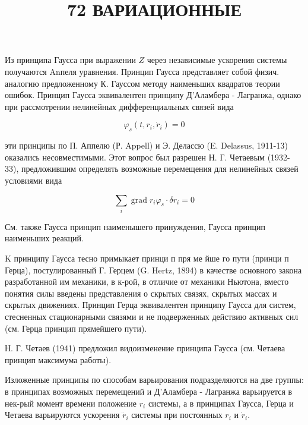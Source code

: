 \documentclass[10pt]{article}
\title{72 ВАРИАЦИОННЫЕ }
\author{}
\date{}
\begin{document}
\maketitle

Из принципа Гаусса при выражении $Z$ через независимые ускорения системы получаются Anпеля уравнения. Принцип Гаусса представляет собой физич. аналогию предложенному К. Гауссом методу наименьших квадратов теории ошибок. Принцип Гаусса эквивалентен принципу Д'Аламбера - Лагранжа, однако при рассмотрении нелинейных дифференциальных связей вида



\[

\varphi_{s}\left(t, r_{i}, \dot{r}_{i}\right)=0

\]



эти принципы по П. Аппелю (Р. Appell) и Э. Делассю (E. Delassus, 1911-13) оказались несовместимыми. Этот вопрос был разрешен Н. Г. Четаевым (1932-33), предложившим определять возможные перемещения для нелинейных связей условиями вида



\[

\sum_{i} \operatorname{grad} r_{i} \varphi_{s} \cdot \delta r_{i}=0

\]



См. также Гаусса принцип наименышего принуждения, Гаусса принцип наименьших реакций.



K принципу Гаусса тесно примыкает принци п пря ме йше го пути (принци п Герца), постулированный Г. Герцем (G. Hertz, 1894) в качестве основного закона разработанной им механики, в к-рой, в отличие от механики Ньютона, вместо понятия силы введены представления о скрытых связях, скрытых массах и скрытых движениях. Принцип Герца эквивалентен принципу Гаусса для систем, стесненных стационарными связями и не подверженных действию активных сил (см. Герца принцип прямейшего пути).



Н. Г. Четаев (1941) предложил видоизменение принципа Гаусса (см. Четаева принцип максимума работы).



Изложенные принципы по способам варьирования подразделяются на две группы: в принципах возможных перемещений и Д'Аламбера - Лагранжа варьируется в нек-рый момент времени положение $r_{i}$ системы, а в принципах Гаусса, Герца и Четаева варьируются ускорения $\ddot{r}_{i}$ системы при постоянных $r_{i}$ и $\dot{r}_{i}$.
\end{document}
